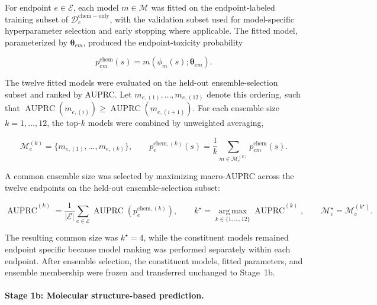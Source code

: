 \documentclass[11pt,a4paper]{article}
\begin{document}
For endpoint $e\in\mathcal E$, each model $m\in\mathcal M$ was fitted on
the endpoint-labeled training subset of
$\mathcal D^{\mathrm{chem-only}}_e$, with the validation
subset used for model-specific hyperparameter selection and early
stopping where applicable. The fitted model, parameterized by
$\boldsymbol\theta_{em}$, produced the endpoint-toxicity probability

\begin{equation}
p^{\mathrm{chem}}_{em}(s)
=
m\!\left(
\phi_m(s);
\boldsymbol\theta_{em}
\right).
\label{eq:individual-molecular-prediction}
\end{equation}

The twelve fitted models were evaluated on the held-out
ensemble-selection subset and ranked by AUPRC. Let
$m_{e,(1)},\ldots,m_{e,(12)}$ denote this ordering, such that
$\operatorname{AUPRC}(m_{e,(i)})
\geq
\operatorname{AUPRC}(m_{e,(i+1)})$.
For each ensemble size $k=1,\ldots,12$, the top-$k$ models
were combined by unweighted averaging,

\begin{equation}
\mathcal M_e^{(k)}
=
\{m_{e,(1)},\ldots,m_{e,(k)}\},
\qquad
p^{\mathrm{chem},(k)}_e(s)
=
\frac{1}{k}
\sum_{m\in\mathcal M_e^{(k)}}
p^{\mathrm{chem}}_{em}(s).
\label{eq:candidate-molecular-ensemble}
\end{equation}

A common ensemble size was selected by maximizing macro-AUPRC across the
twelve endpoints on the held-out ensemble-selection subset:

\begin{equation}
\overline{\operatorname{AUPRC}}^{(k)}
=
\frac{1}{|\mathcal E|}
\sum_{e\in\mathcal E}
\operatorname{AUPRC}
\!\left(p^{\mathrm{chem},(k)}_e\right),
\qquad
k^\star
=
\operatorname*{arg\,max}_{k\in\{1,\ldots,12\}}
\overline{\operatorname{AUPRC}}^{(k)},
\qquad
\mathcal M_e^\star
=
\mathcal M_e^{(k^\star)}.
\label{eq:ensemble-selection}
\end{equation}

The resulting common size was $k^\star=4$, while the constituent models
remained endpoint specific because model ranking was performed separately
within each endpoint. After ensemble selection, the constituent models,
fitted parameters, and ensemble membership were frozen and transferred
unchanged to Stage~1b.

\paragraph{Stage 1b: Molecular structure-based prediction.}
\end{document}
